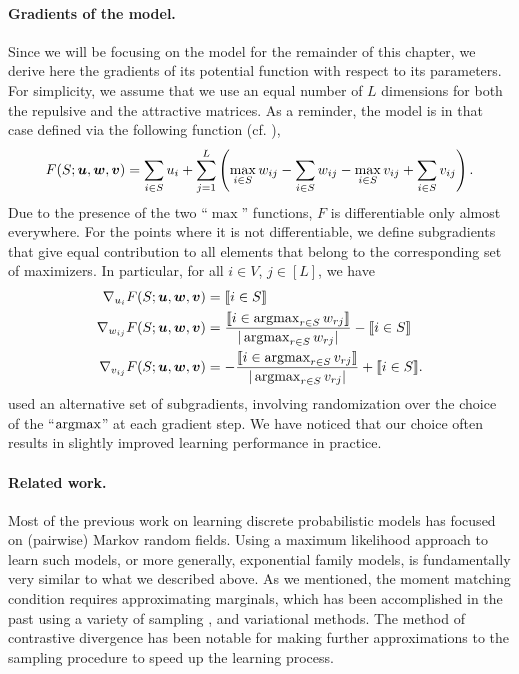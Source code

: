 \paragraph{Gradients of the \fldc{} model.}
Since we will be focusing on the \fldc{} model for the remainder of this chapter, we derive here the gradients of its potential function with respect to its parameters.
For simplicity, we assume that we use an equal number of $L$ dimensions for both the repulsive and the attractive matrices.
As a reminder, the \fldc{} model is in that case defined via the following function (cf. ),
\begin{align*}
F(S; \bm{u}, \bm{w}, \bm{v}) = \sum_{i \in S} u_i + \sum_{j=1}^{L} \left(\max_{i \in S} w_{ij} - \sum_{i \in S} w_{ij} - \max_{i \in S} v_{ij} + \sum_{i \in S} v_{ij}\right).
\end{align*}
Due to the presence of the two ``$\max$'' functions, $F$ is differentiable only almost everywhere.
For the points where it is not differentiable, we define subgradients that give equal contribution to all elements that belong to the corresponding set of maximizers.
In particular, for all $i \in V$, $j \in [L]$, we have
\begin{align*}
\nabla_{u_i} F(S; \bu, \bw, \bv) &= \llbracket i \in S\rrbracket\\
\nabla_{w_{ij}} F(S; \bu, \bw, \bv) &= \frac{\llbracket i \in \argmax_{r \in S} w_{rj}\rrbracket}{|\argmax_{r \in S} w_{rj}|} - \llbracket i \in S\rrbracket\\
\nabla_{v_{ij}} F(S; \bu, \bw, \bv) &= -\frac{\llbracket i \in \argmax_{r \in S} v_{rj}\rrbracket}{|\argmax_{r \in S} v_{rj}|} + \llbracket i \in S\rrbracket.
\end{align*}
\citet{tschiatschek16} used an alternative set of subgradients, involving randomization over the choice of the ``$\argmax$'' at each gradient step.
We have noticed that our choice often results in slightly improved learning performance in practice.

\paragraph{Related work.}
Most of the previous work on learning discrete probabilistic models has focused on (pairwise) Markov random fields.
Using a maximum likelihood approach to learn such models, or more generally, exponential family models, is fundamentally very similar to what we described above.
As we mentioned, the moment matching condition requires approximating marginals, which has been accomplished in the past using a variety of sampling \citep{geyer91}, and variational \citep{wainwright08} methods.
The method of contrastive divergence \citep{condiv} has been notable for making further approximations to the sampling procedure to speed up the learning process.

